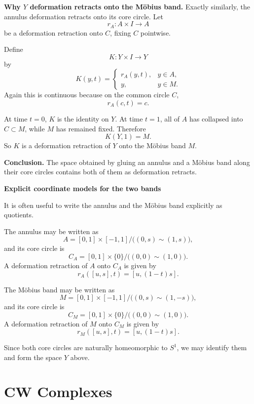 \begin{solution}
\textbf{Why \(Y\) deformation retracts onto the Möbius band.}
Exactly similarly, the annulus deformation retracts onto its core circle. Let
\[
r_A:A\times I\to A
\]
be a deformation retraction onto \(C\), fixing \(C\) pointwise.

Define
\[
K:Y\times I\to Y
\]
by
\[
K(y,t)=
\begin{cases}
	r_A(y,t),& y\in A,\\[4pt]
	y,& y\in M.
\end{cases}
\]
Again this is continuous because on the common circle \(C\),
\[
r_A(c,t)=c.
\]

At time \(t=0\), \(K\) is the identity on \(Y\). At time \(t=1\), all of \(A\) has collapsed into \(C\subset M\), while \(M\) has remained fixed. Therefore
\[
K(Y,1)=M.
\]
So \(K\) is a deformation retraction of \(Y\) onto the Möbius band \(M\).

\par

\textbf{Conclusion.}
The space obtained by gluing an annulus and a Möbius band along their core circles contains both of them as deformation retracts.


\medskip
\noindent\textbf{Explicit coordinate models for the two bands}\par
\smallskip


It is often useful to write the annulus and the Möbius band explicitly as quotients.

The annulus may be written as
\[
A=[0,1]\times [-1,1]\big/\bigl((0,s)\sim (1,s)\bigr),
\]
and its core circle is
\[
C_A=[0,1]\times \{0\}\big/\bigl((0,0)\sim (1,0)\bigr).
\]
A deformation retraction of \(A\) onto \(C_A\) is given by
\[
r_A([u,s],t)=[u,(1-t)s].
\]

The Möbius band may be written as
\[
M=[0,1]\times [-1,1]\big/\bigl((0,s)\sim (1,-s)\bigr),
\]
and its core circle is
\[
C_M=[0,1]\times \{0\}\big/\bigl((0,0)\sim (1,0)\bigr).
\]
A deformation retraction of \(M\) onto \(C_M\) is given by
\[
r_M([u,s],t)=[u,(1-t)s].
\]

Since both core circles are naturally homeomorphic to \(S^1\), we may identify them and form the space \(Y\) above.
\end{solution}

\section{CW Complexes}

